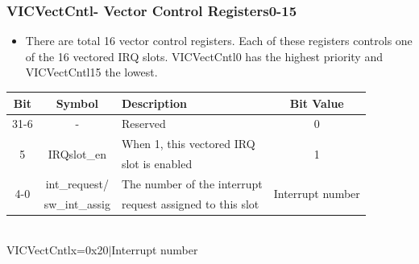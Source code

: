 \documentclass[table,10pt,red]{beamer}
\begin{document}
\begin{frame}
	\frametitle{VICVectCntl- Vector Control Registers0-15}
	\begin{itemize}
		\item There are total 16 vector control registers. Each of these registers controls one of the 16 vectored IRQ slots. VICVectCntl0 has the highest priority and VICVectCntl15 the lowest. \pause \\[8pt] 
	\end{itemize} 
	\centering
	\small
	\begin{tabular}{|c|c|l|c|}
		\hline
		Bit & Symbol & Description & Bit Value  \\
		\hline  
		31-6 & - & Reserved &  0  \\
		\hline
		\multirow{2}{*}{5} & \multirow{2}{*}{IRQslot\_en}  & When 1, this vectored IRQ & \multirow{2}{*}{\color{red}1\color{black}} \\
		                   &                               & slot is enabled &    \\
		\hline
		\multirow{2}{*}{4-0} & int\_request/ & The number of the interrupt &  \multirow{2}{*}{Interrupt number}  \\
		                     & sw\_int\_assig & request assigned to this slot & \\
		\hline
	\end{tabular}	\pause \\[8pt]
	VICVectCntlx\hspace{1pt}=\hspace{1pt}\color{red}0x20$|$Interrupt number \color{black}
\end{frame}		
\end{document}
